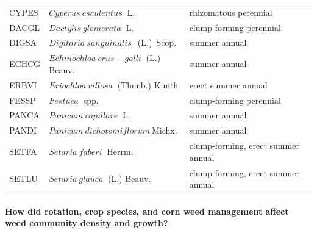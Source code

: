 \documentclass[
]{article}
\begin{document}
\begin{table}
\begin{tabular}[t]{l|l|l}
\hspace{1em}CYPES & $Cyperus~esculentus$$~$ L. & rhizomatous perennial\\
 
\hspace{1em}DACGL & $Dactylis~glomerata$$~$ L. & clump-forming perennial\\
 
\hspace{1em}DIGSA & $Digitaria~sanguinalis$$~$~(L.)~Scop. & summer annual\\
 
\hspace{1em}ECHCG & $Echinochloa~crus-galli$$~$ (L.) Beauv. & summer annual\\
 
\hspace{1em}ERBVI & $Eriochloa~villosa$$~$ (Thunb.) Kunth & erect summer annual\\
 
\hspace{1em}FESSP & $Festuca$$~$ spp. & clump-forming perennial\\
 
\hspace{1em}PANCA & $Panicum~capillare$$~$ L. & summer annual\\
 
\hspace{1em}PANDI & $Panicum~dichotomiflorum$$~$Michx. & summer annual\\
 
\hspace{1em}SETFA & $Setaria~faberi$$~$ Herrm. & clump-forming, erect summer annual\\
 
\hspace{1em}SETLU & $Setaria~glauca$$~$ (L.) Beauv. & clump-forming, erect summer annual\\
\hline
\end{tabular}
\end{table}

\hypertarget{how-did-rotation-crop-species-and-corn-weed-management-affect-weed-community-density-and-growth}{%
\paragraph*{How did rotation, crop species, and corn weed management affect weed community density and growth?}\label{how-did-rotation-crop-species-and-corn-weed-management-affect-weed-community-density-and-growth}}
\end{document}
